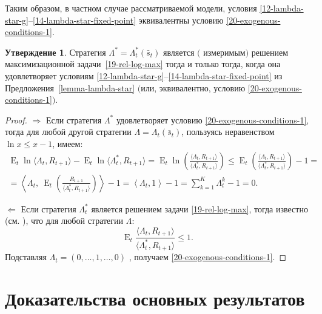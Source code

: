 \documentclass[a4paper,12pt,russian]{article} %
\theoremstyle{definition}
\newtheorem{proposition}{Утверждение}
\DeclareMathOperator{\E}{E}
\begin{document}
Таким образом, в частном случае рассматриваемой модели, условия \eqref{12-lambda-star-g}--\eqref{14-lambda-star-fixed-point} эквивалентны условию \eqref{20-exogenous-conditions-1}.

\begin{proposition}
\label{prop3-maximaize-logreturns}
 Стратегия $\Lambda^* = \Lambda^*_t(\bar s_t)$  является $($ измеримым$)$ решением максимизационной задачи~\eqref{19-rel-log-max} тогда и только тогда, когда она удовлетворяет условиям \eqref{12-lambda-star-g}--\eqref{14-lambda-star-fixed-point} из Предложения~\ref{lemma-lambda-star} $($или, эквивалентно, условию \eqref{20-exogenous-conditions-1}$)$.
\end{proposition}

\begin{proof}
$ \Rightarrow$ Если стратегия  $\Lambda^*$ удовлетворяет условию \eqref{20-exogenous-conditions-1}, тогда для любой другой стратегии  $\Lambda = \Lambda_t(\bar s_t)$, пользуясь неравенством $\ln x \le x-1$, имеем:
\begin{multline*}
\E_t \ln\langle\Lambda_t,R_{t+1}\rangle 
  - \E_t \ln\langle\Lambda_t^*,R_{t+1}\rangle
= \E_t\ln\left( 
  \frac{\langle\Lambda_t,R_{t+1}\rangle}
       {\langle\Lambda_t^*,R_{t+1}\rangle}
\right) 
\le \E_t\left( 
  \frac{\langle\Lambda_t,R_{t+1}\rangle}
       {\langle\Lambda_t^*,R_{t+1}\rangle}
\right) - 1 =\\
= \left\langle \Lambda_t,
  \ \E_t\left(\frac{R_{t+1}}{\langle\Lambda_t^*,R_{t+1}\rangle}\right) 
\right\rangle - 1
=  \left\langle \Lambda_t,
  1 \right\rangle - 1=
\sum_{k=1}^K \Lambda_{t}^k - 1 = 0.
\end{multline*}

$ \Leftarrow$
Если стратегия $\Lambda_t^*$ является решением задачи \eqref{19-rel-log-max}, тогда известно (см. \cite[Т.~1]{AlgoetCover88}), что для любой стратегии $\Lambda$:
\[
\E_t \frac{\langle \Lambda_t, R_{t+1}\rangle}{\langle \Lambda_t^*, R_{t+1}\rangle} \le 1.
\]
Подставляя $\Lambda_t = (0,\dots,1,\dots,0)$ , получаем \eqref{20-exogenous-conditions-1}. 
\end{proof}





\section{Доказательства основных результатов}
\label{section6-proofs}
\end{document}

